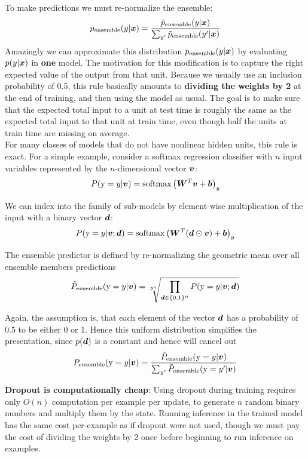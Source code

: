 \begin{multicols}{2}
	To make predictions we must re-normalize the ensemble:
	\[ p_{\text{ensemble}}(y|{\bm{x}}) = \frac{\tilde{p}_{\text{ensemble}}(y|{\bm{x}})}{\sum_{y'}\tilde{p}_{\text{ensemble}}(y'|{\bm{x}})} \]
	Amazingly we can approximate this distribution $p_{\text{ensemble}}(y|{\bm{x}})$ by evaluating $p(y|{\bm{x}})$ in \textbf{one} model.
	The motivation for this modification is to capture the right expected value of the output from that unit.
	Because we usually use an inclusion probability of 0.5, this rule basically amounts to \textbf{dividing the weights by 2} at the end of training, and then using the model as usual.
	The goal is to make sure that the expected total input to a unit at test time is roughly the same as the expected total input to that unit at train time, even though half the units at train time are missing on average.\\
	
	For many classes of models that do not have nonlinear hidden units, this rule is exact.
	For a simple example, consider a softmax regression classifier with $n$ input variables represented by the $n$-dimensional vector ${\bm{v}}$:
	\[ P({\textnormal{y}}=y|{\bm{v}}) =\mathrm{softmax}\left({\bm{W}}^T{\bm{v}}+{\bm{b}}\right)_y \]
	
	We can index into the family of sub-models by element-wise multiplication of the input with a binary vector ${\bm{d}}$:
	\[ P({\textnormal{y}}=y|{\bm{v}};{\bm{d}}) = \mathrm{softmax}\left({\bm{W}}^T({\bm{d}}\odot{\bm{v}})+{\bm{b}}\right)_y \]
	
	The ensemble predictor is defined by re-normalizing the geometric mean over all ensemble members predictions
	\[ \tilde{P}_{\text{ensemble}}({\textnormal{y}}=y|{\bm{v}}) = \sqrt[2^n]{\prod_{{\bm{d}}\in\{0,1\}^n} P({\textnormal{y}}=y|{\bm{v}};{\bm{d}})} \]
	
	Again, the assumption is, that each element of the vector ${\bm{d}}$ has a probability of 0.5 to be either 0 or 1. Hence this uniform distribution simplifies the presentation, since $p({\bm{d}})$ is a constant and hence will cancel out
	\[ P_{\text{ensemble}}({\textnormal{y}}=y|{\bm{v}}) = \frac{\tilde{P}_{\text{ensemble}}({\textnormal{y}}=y|{\bm{v}})} {\sum_{y'}\tilde{P}_{\text{ensemble}}({\textnormal{y}}=y'|{\bm{v}})} \]
	
	\textbf{Dropout is computationally cheap}: Using dropout during training requires only $O(n)$ computation per example per update, to generate $n$ random binary numbers and multiply them by the state.
	Running inference in the trained model has the same cost per-example as if dropout were not used, though we must pay the cost of dividing the weights by 2 once before beginning to run inference on examples.\\
	

\end{multicols}
